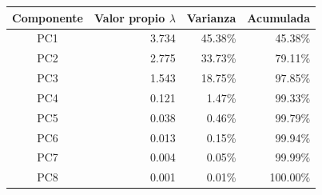 \small
\begin{tabular}{crrr}
\toprule
Componente & Valor propio $\lambda$ & Varianza & Acumulada \\
\midrule
PC1 & 3.734 & 45.38\% & 45.38\% \\
PC2 & 2.775 & 33.73\% & 79.11\% \\
PC3 & 1.543 & 18.75\% & 97.85\% \\
PC4 & 0.121 & 1.47\% & 99.33\% \\
PC5 & 0.038 & 0.46\% & 99.79\% \\
PC6 & 0.013 & 0.15\% & 99.94\% \\
PC7 & 0.004 & 0.05\% & 99.99\% \\
PC8 & 0.001 & 0.01\% & 100.00\% \\
\bottomrule
\end{tabular}
